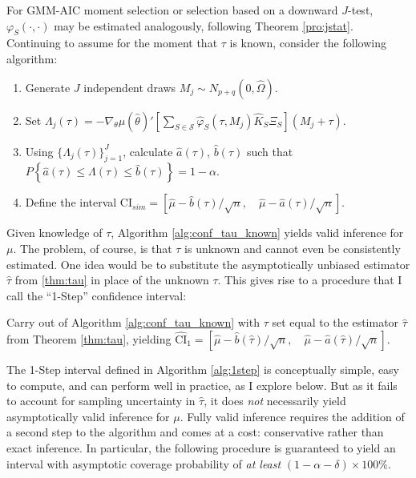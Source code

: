 For GMM-AIC moment selection or selection based on a downward $J$-test, $\varphi_S(\cdot,\cdot)$ may be estimated analogously, following  Theorem \ref{pro:jstat}. 
Continuing to assume for the moment that $\tau$ is known, consider the following algorithm:
\begin{alg}
\mbox{}
		\begin{enumerate}
\label{alg:conf_tau_known}
			\item Generate $J$ independent draws $M_j \sim N_{p+q}(0, \widehat{\Omega})$.
			\item Set $\Lambda_j(\tau) = -\nabla_\theta\mu(\widehat{\theta})'\left[\sum_{S \in \mathscr{S}} \widehat{\varphi}_S(\tau,M_j) \widehat{K}_S\Xi_S\right] (M_j + \tau)$.
			\item Using $\{\Lambda_j(\tau)\}_{j=1}^J$, calculate $\widehat{a}(\tau)$, $\widehat{b}(\tau)$ such that
		$P\left\{ \widehat{a}(\tau) \leq\Lambda(\tau)\leq \widehat{b}(\tau) \right\} = 1 - \alpha$.
  \item Define the interval 
    $ \mbox{CI}_{sim}=\left[ \widehat{\mu} - \widehat{b}(\tau)/\sqrt{n}, \quad \widehat{\mu} - \widehat{a}(\tau)/\sqrt{n} \right]$.
		\end{enumerate}
\end{alg}

Given knowledge of $\tau$, Algorithm \ref{alg:conf_tau_known} yields valid inference for $\mu$.
The problem, of course, is that $\tau$ is unknown and cannot even be consistently estimated.
One idea would be to substitute the asymptotically unbiased estimator $\widehat{\tau}$ from \ref{thm:tau} in place of the unknown $\tau$.
This gives rise to a procedure that I call the ``1-Step'' confidence interval:

\begin{alg}[1-Step CI] 
  \label{alg:1step}
Carry out of Algorithm \ref{alg:conf_tau_known} with $\tau$ set equal to the estimator $\widehat{\tau}$ from Theorem \ref{thm:tau}, yielding 
$ \widehat{\mbox{CI}}_{1}=\left[ \widehat{\mu} - \widehat{b}(\widehat{\tau})/\sqrt{n}, \quad \widehat{\mu} - \widehat{a}(\widehat{\tau})/\sqrt{n} \right]$.
\end{alg}

The 1-Step interval defined in Algorithm \ref{alg:1step} is conceptually simple, easy to compute, and can perform well in practice, as I explore below.
But as it fails to account for sampling uncertainty in $\widehat{\tau}$,  it does \emph{not} necessarily yield asymptotically valid inference for $\mu$.
Fully valid inference requires the addition of a second step to the algorithm and comes at a cost: conservative rather than exact inference.
In particular, the following procedure is guaranteed to yield an interval with asymptotic coverage probability of \emph{at least} $(1-\alpha-\delta)\times 100\%$.

